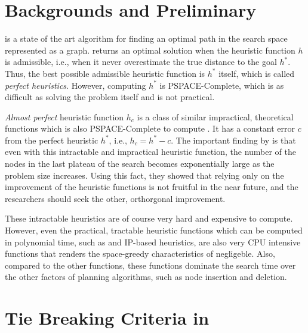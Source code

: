 \section{Backgrounds and Preliminary}
\label{sec-1}


\astar is a state of the art algorithm for finding an optimal path in the
search space represented as a graph. 
\astar returns an optimal solution when the heuristic function $h$ is
admissible, i.e., when it never overestimate the true distance to the goal
$h^*$.
% 
Thus, the best possible admissible heuristic function is $h^*$ itself, which is
called \emph{perfect heuristics}. However, computing $h^*$ is PSPACE-Complete,
which is as difficult as solving the problem itself and is not
practical.


\emph{Almost perfect} heuristic function $h_c$ is a class of similar
impractical, theoretical functions which is also PSPACE-Complete to
compute \cite{helmert2008good}.  It has a constant error $c$ from the
perfect heuristic $h^*$, i.e., $h_c=h^*-c$.  The important finding by
\citeauthor{helmert2008good} is that even with this intractable and
impractical heuristic function, the number of the nodes in the last
plateau of the search becomes exponentially large as the problem size
increases.  Using this fact, they showed that relying only on the
improvement of the heuristic functions is not fruitful in the near
future, and the researchers should seek the other,
orthorgonal improvement.

These intractable heuristics are of course very hard and expensive to
compute. However, even the practical, tractable heuristic functions
which can be computed in polynomial time, such as \lmcut and IP-based
heuristics, are also very CPU intensive functions that renders the
space-greedy characteristics of \astar negligeble. Also, compared to the
other functions, these functions dominate the search time over the other
factors of planning algorithms, such as node insertion and deletion.


\section{Tie Breaking Criteria in \astar}


